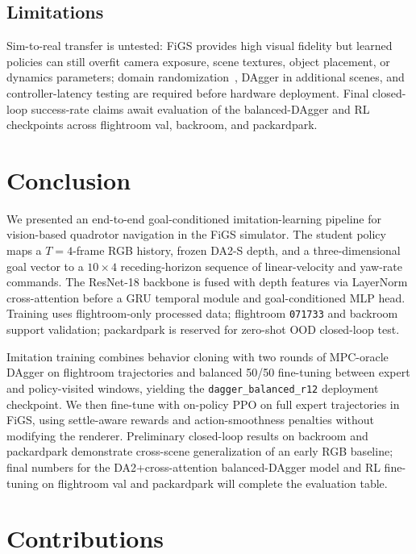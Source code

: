 \documentclass[10pt,twocolumn,letterpaper]{article}
\begin{document}
\subsection{Limitations}

Sim-to-real transfer is untested: FiGS provides high visual fidelity but learned policies can still overfit camera exposure, scene textures, object placement, or dynamics parameters; domain randomization~\cite{tobin2017domain}, DAgger in additional scenes, and controller-latency testing are required before hardware deployment. Final closed-loop success-rate claims await evaluation of the balanced-DAgger and RL checkpoints across flightroom val, backroom, and packardpark.

\section{Conclusion}
\label{sec:conclusion}

We presented an end-to-end goal-conditioned imitation-learning pipeline for vision-based quadrotor navigation in the FiGS simulator. The student policy maps a $T{=}4$-frame RGB history, frozen DA2-S depth, and a three-dimensional goal vector to a $10\times4$ receding-horizon sequence of linear-velocity and yaw-rate commands. The ResNet-18 backbone is fused with depth features via LayerNorm cross-attention before a GRU temporal module and goal-conditioned MLP head. Training uses flightroom-only processed data; flightroom \texttt{071733} and backroom support validation; packardpark is reserved for zero-shot OOD closed-loop test.

Imitation training combines behavior cloning with two rounds of MPC-oracle DAgger on flightroom trajectories and balanced 50/50 fine-tuning between expert and policy-visited windows, yielding the \texttt{dagger\_balanced\_r12} deployment checkpoint. We then fine-tune with on-policy PPO on full expert trajectories in FiGS, using settle-aware rewards and action-smoothness penalties without modifying the renderer. Preliminary closed-loop results on backroom and packardpark demonstrate cross-scene generalization of an early RGB baseline; final numbers for the DA2+cross-attention balanced-DAgger model and RL fine-tuning on flightroom val and packardpark will complete the evaluation table.

\section*{Contributions}
\end{document}
